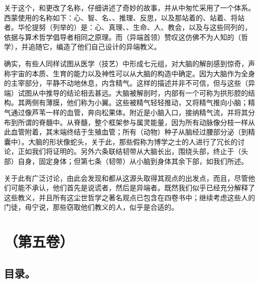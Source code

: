 关于这个，和更改了名称，仔细讲述了奇妙的故事，并从中匆忙采用了一个体系。西蒙使用的名称如下：心、智、名、、推理、反思，以及那站着的、站着、将站者。华伦提努（列举的）是：心、真理、、生命、人、教会，以及与这些同列的，依据与算术哲学倡导者相同之原理。而（异端首领）赞叹这仿佛不为人知的（哲学），并追随它，编造了他们自己设计的异端教义。\par

确实，有些人同样试图从医学（技艺）中形成七元组，对大脑的解剖感到惊奇，声称宇宙的本质、生育的能力以及神性可以从大脑的构造中确定。因为大脑作为全身的主宰部分，平静不动地休息，内含精气。这样的描述并非不可信，但与这些（异端）试图从中推导的结论相去甚远。大脑被解剖时，内部有一个可称为拱形腔的结构。其两侧有薄膜，他们称为小翼。这些被精气轻轻推动，又将精气推向小脑；精气通过像芦苇一样的血管，奔向松果体。附近是小脑入口，接纳精气流，并将其分布到所谓的脊髓中。从脊髓，整个框架参与属灵能量，因为所有动脉像分枝一样从此血管附着，其末端终结于生殖血管；所有（动物）种子从脑经过腰部分泌（到精囊中）。大脑的形状像蛇头，关于此，那些假称为博学之士的人进行了冗长的讨论，正如我们将证明的。另外六条联结韧带从大脑长出，围绕头部，终止于（头部）自身，固定身体；但第七条（韧带）从小脑到身体其余下部，如我们所述。\par

关于此有广泛讨论，由此会发现和都从这源头取得其观点的出发点，而且，尽管他们可能不承认，他们首先是说谎者，然后是异端者。既然我们似乎已经充分解释了这些教义，并且所有这尘世哲学之著名观点已包含在四卷书中；继续考虑这些人的门徒，毋宁说，那些窃取他们教义的人，似乎是合适的。\par



\section{（第五卷）}


\subsection{目录。}

